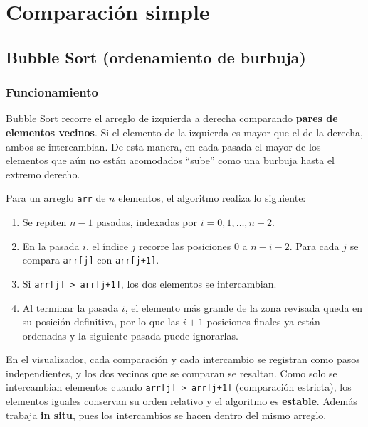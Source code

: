 \documentclass[11pt,letterpaper]{article}
\begin{document}


\section{Comparación simple}

\subsection{Bubble Sort (ordenamiento de burbuja)}
\subsubsection{Funcionamiento}

Bubble Sort recorre el arreglo de izquierda a derecha comparando \textbf{pares de elementos vecinos}. Si el elemento de la izquierda es mayor que el de la derecha, ambos se intercambian. De esta manera, en cada pasada el mayor de los elementos que aún no están acomodados ``sube'' como una burbuja hasta el extremo derecho.

Para un arreglo \texttt{arr} de $n$ elementos, el algoritmo realiza lo siguiente:

\begin{enumerate}
  \item Se repiten $n-1$ pasadas, indexadas por $i = 0, 1, \dots, n-2$.
  \item En la pasada $i$, el índice $j$ recorre las posiciones $0$ a $n-i-2$. Para cada $j$ se compara \texttt{arr[j]} con \texttt{arr[j+1]}.
  \item Si \texttt{arr[j] > arr[j+1]}, los dos elementos se intercambian.
  \item Al terminar la pasada $i$, el elemento más grande de la zona revisada queda en su posición definitiva, por lo que las $i+1$ posiciones finales ya están ordenadas y la siguiente pasada puede ignorarlas.
\end{enumerate}

En el visualizador, cada comparación y cada intercambio se registran como pasos independientes, y los dos vecinos que se comparan se resaltan. Como solo se intercambian elementos cuando \texttt{arr[j] > arr[j+1]} (comparación estricta), los elementos iguales conservan su orden relativo y el algoritmo es \textbf{estable}. Además trabaja \textbf{in situ}, pues los intercambios se hacen dentro del mismo arreglo.
\end{document}
